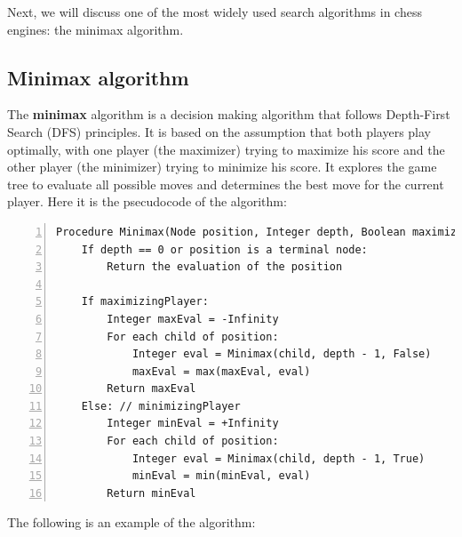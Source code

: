 \vspace{1em}

\noindent Next, we will discuss one of the most widely used search algorithms in chess engines: the minimax algorithm.

\subsection{Minimax algorithm}

The \textbf{minimax} algorithm is a decision making algorithm that follows Depth-First Search (DFS) principles. It is based on the assumption that both players play optimally, with one player (the maximizer) trying to maximize his score and the other player (the minimizer) trying to minimize his score. It explores the game tree to evaluate all possible moves and determines the best move for the current player. Here it is the psecudocode of the algorithm:

\begin{lstlisting}[caption={Pseudocode of the Minimax algorithm.}, captionpos=b, frame=single, numbers=left, xleftmargin=15pt, breaklines=true]
Procedure Minimax(Node position, Integer depth, Boolean maximizingPlayer):
    If depth == 0 or position is a terminal node:
        Return the evaluation of the position

    If maximizingPlayer:
        Integer maxEval = -Infinity
        For each child of position:
            Integer eval = Minimax(child, depth - 1, False)
            maxEval = max(maxEval, eval)
        Return maxEval
    Else: // minimizingPlayer
        Integer minEval = +Infinity
        For each child of position:
            Integer eval = Minimax(child, depth - 1, True)
            minEval = min(minEval, eval)
        Return minEval
\end{lstlisting}

The following is an example of the algorithm:

